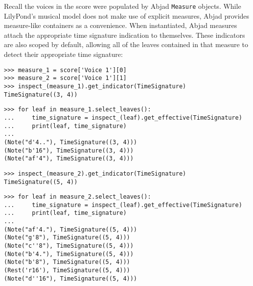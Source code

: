 \noindent Recall the voices in the score were populated by Abjad
\texttt{Measure} objects. While LilyPond's musical model does not make use of
explicit measures, Abjad provides measure-like containers as a convenience.
When instantiated, Abjad measures attach the appropriate time signature
indication to themselves. These indicators are also scoped by default, allowing
all of the leaves contained in that measure to detect their appropriate time
signature:

\begin{comment}
<abjad>
measure_1 = score['Voice 1'][0]
measure_2 = score['Voice 1'][1]
inspect_(measure_1).get_indicator(TimeSignature)
for leaf in measure_1.select_leaves():
    time_signature = inspect_(leaf).get_effective(TimeSignature)
    print(leaf, time_signature)

inspect_(measure_2).get_indicator(TimeSignature)
for leaf in measure_2.select_leaves():
    time_signature = inspect_(leaf).get_effective(TimeSignature)
    print(leaf, time_signature)

</abjad>
\end{comment}

\begin{abjadbookoutput}
\begin{singlespacing}
\vspace{-0.5\baselineskip}
\begin{verbatim}
>>> measure_1 = score['Voice 1'][0]
>>> measure_2 = score['Voice 1'][1]
>>> inspect_(measure_1).get_indicator(TimeSignature)
TimeSignature((3, 4))
\end{verbatim}
\begin{verbatim}
>>> for leaf in measure_1.select_leaves():
...     time_signature = inspect_(leaf).get_effective(TimeSignature)
...     print(leaf, time_signature)
...
(Note("d'4.."), TimeSignature((3, 4)))
(Note("b'16"), TimeSignature((3, 4)))
(Note("af'4"), TimeSignature((3, 4)))
\end{verbatim}
\begin{verbatim}
>>> inspect_(measure_2).get_indicator(TimeSignature)
TimeSignature((5, 4))
\end{verbatim}
\begin{verbatim}
>>> for leaf in measure_2.select_leaves():
...     time_signature = inspect_(leaf).get_effective(TimeSignature)
...     print(leaf, time_signature)
...
(Note("af'4."), TimeSignature((5, 4)))
(Note("g'8"), TimeSignature((5, 4)))
(Note("c''8"), TimeSignature((5, 4)))
(Note("b'4."), TimeSignature((5, 4)))
(Note("b'8"), TimeSignature((5, 4)))
(Rest('r16'), TimeSignature((5, 4)))
(Note("d''16"), TimeSignature((5, 4)))
\end{verbatim}
\end{singlespacing}
\end{abjadbookoutput}

